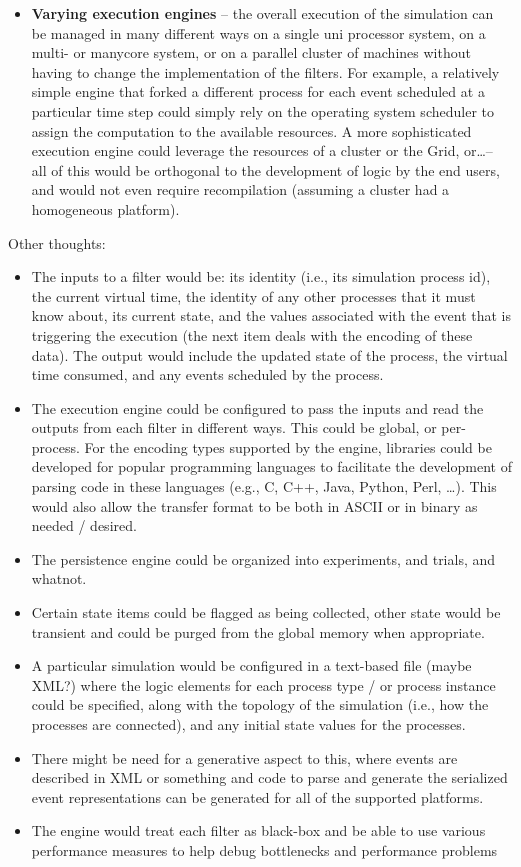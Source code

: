 \documentclass[10pt,notitlepage]{article}
\begin{document}
\begin{itemize}
  \item{\textbf{Varying execution engines} -- the overall execution of
    the simulation can be managed in many different ways on a single
    uni processor system, on a multi- or manycore system, or on a
    parallel cluster of machines without having to change the
    implementation of the filters.  For example, a relatively simple
    engine that forked a different process for each event scheduled at
    a particular time step could simply rely on the operating system
    scheduler to assign the computation to the available resources.  A
    more sophisticated execution engine could leverage the resources
    of a cluster or the Grid, or\dots -- all of this would be
    orthogonal to the development of logic by the end users, and would
    not even require recompilation (assuming a cluster had a
    homogeneous platform).}
\end{itemize}

Other thoughts:
\begin{itemize}
\item{The inputs to a filter would be: its identity (i.e., its
  simulation process id), the current virtual time, the identity of
  any other processes that it must know about, its current state, and
  the values associated with the event that is triggering the
  execution (the next item deals with the encoding of these data).
  The output would include the updated state of the process, the
  virtual time consumed, and any events scheduled by the process.}
\item{The execution engine could be configured to pass the inputs and
  read the outputs from each filter in different ways.  This could be
  global, or per-process.  For the encoding types supported by the
  engine, libraries could be developed for popular programming
  languages to facilitate the development of parsing code in these
  languages (e.g., C, C++, Java, Python, Perl, \dots).  This would
  also allow the transfer format to be both in ASCII or in binary as
  needed / desired.}
\item{The persistence engine could be organized into experiments, and
  trials, and whatnot.}
\item{Certain state items could be flagged as being collected, other
  state would be transient and could be purged from the global memory
  when appropriate.}
\item{A particular simulation would be configured in a text-based file
  (maybe XML?) where the logic elements for each process type / or
  process instance could be specified, along with the topology of the
  simulation (i.e., how the processes are connected), and any initial
  state values for the processes.}
\item{There might be need for a generative aspect to this, where
  events are described in XML or something and code to parse and
  generate the serialized event representations can be generated for
  all of the supported platforms.}

\item{The engine would treat each filter as black-box and be able to
  use various performance measures to help debug bottlenecks and
  performance problems}
\end{itemize}
\end{document}
